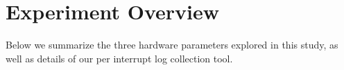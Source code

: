\section{Experiment Overview}

Below we summarize the three hardware parameters explored in this study, as well
as details of our per interrupt log collection tool.

